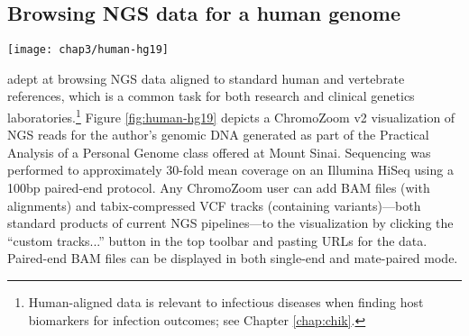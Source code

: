 
\subsection{Browsing NGS data for a human genome}

\begin{figure*}[htb]
  \texttt{[image: chap3/human-hg19]}
  \vspace{-1em}
  \caption[NGS reads for the author's genome aligned to GRCh37/hg19]{\textbf{NGS reads for the author's genome aligned to GRCh37/hg19}, displayed in paired mode, and corresponding variant calls. The ``UCSC Genes'' and ``ClinVar Main'' tracks are mirrored from UCSC, while the other two were loaded from URLs pasted into the interface by the user; ``alignedReadsPaired'' is in BAM format while ``calledVariants'' is a tabix-compressed VCF file. A heterozygous C/T variant in the \emph{AARS} coding sequence is visible to the righthand side, which is annotated in the ClinVar track as a benign variant (light gray G>A; annotated to reverse strand). More alignments are stacked vertically than can be displayed, as indicated by the orange clipping indicator, which could be remedied by resizing the tracks or using the adjacent scrollbar (mouse cursors).\vspace{1em}}
  \label{fig:human-hg19}
\end{figure*}

 adept at browsing NGS data aligned to standard human and vertebrate references, which is a common task for both research and clinical genetics laboratories.\footnote{Human-aligned data is relevant to infectious diseases when finding host biomarkers for infection outcomes; see Chapter \ref{chap:chik}.} Figure \ref{fig:human-hg19} depicts a ChromoZoom v2 visualization of NGS reads for the author's genomic DNA generated as part of the Practical Analysis of a Personal Genome class offered at Mount Sinai.\autocite{Linderman2015} Sequencing was performed to approximately 30-fold mean coverage on an Illumina HiSeq using a 100bp paired-end protocol. Any ChromoZoom user can add BAM files (with alignments) and tabix-compressed VCF tracks (containing variants)—both standard products of current NGS pipelines—to the visualization by clicking the ``custom tracks...'' button in the top toolbar and pasting URLs for the data. Paired-end BAM files can be displayed in both single-end and mate-paired mode.

